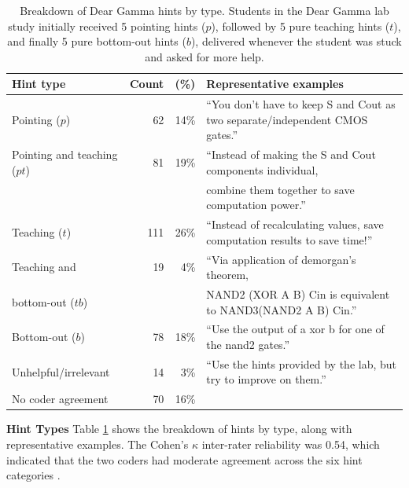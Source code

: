 \begin{table}[t]
  \begin{center}
    \begin{tabular}{|l|r|r|l|}
\hline
      {\bf Hint type} & {\bf Count} & {\bf (\%)} & {\bf Representative examples} \\
\hline
      Pointing ($p$) & 62 & 14\% & ``You don't have to keep S and Cout as two separate/independent CMOS gates.'' \\
      \hline
      Pointing and teaching ($pt$) & 81 & 19\% & ``Instead of making the S and Cout components individual, \\
& & & combine them together to save computation power.'' \\
\hline
      Teaching ($t$) & 111 & 26\% & ``Instead of recalculating values, save computation results to save time!'' \\
\hline
      Teaching and & 19 & 4\% & ``Via application of demorgan's theorem, \\
bottom-out ($tb$) & & & NAND2 (XOR A B) Cin is equivalent to NAND3(NAND2 A B) Cin.''\\
\hline
      Bottom-out ($b$) & 78 & 18\% & ``Use the output of a xor b for one of the nand2 gates.'' \\
\hline
      Unhelpful/irrelevant & 14 & 3\% & ``Use the hints provided by the lab, but try to improve on them.'' \\
\hline
No coder agreement & 70 & 16\% & \\
\hline
    \end{tabular}
 \caption{Breakdown of Dear Gamma hints by type. Students in the Dear Gamma lab study initially received 5 pointing hints ($p$), followed by 5 pure teaching hints ($t$), and finally 5 pure bottom-out hints ($b$), delivered whenever the student was stuck and asked for more help. }
 \label{tab:hintTypes}
  \end{center}
   
\end{table}


{\bf Hint Types} Table \ref{tab:hintTypes} shows the breakdown of hints by type, along with representative examples. The Cohen's $\kappa$ \cite{cohen1960coefficient} inter-rater reliability was 0.54, which indicated that the two coders had moderate agreement across the six hint categories \cite{viera2005understanding}. 

